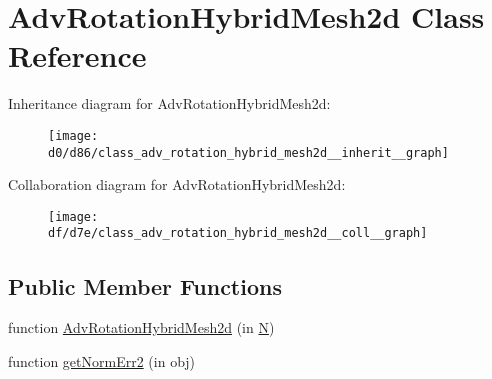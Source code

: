 \hypertarget{class_adv_rotation_hybrid_mesh2d}{}\section{Adv\+Rotation\+Hybrid\+Mesh2d Class Reference}
\label{class_adv_rotation_hybrid_mesh2d}


Inheritance diagram for Adv\+Rotation\+Hybrid\+Mesh2d\+:
\nopagebreak
\begin{figure}[H]
\begin{center}
\leavevmode
\texttt{[image: d0/d86/class\_adv\_rotation\_hybrid\_mesh2d\_\_inherit\_\_graph]}
\end{center}
\end{figure}


Collaboration diagram for Adv\+Rotation\+Hybrid\+Mesh2d\+:
\nopagebreak
\begin{figure}[H]
\begin{center}
\leavevmode
\texttt{[image: df/d7e/class\_adv\_rotation\_hybrid\_mesh2d\_\_coll\_\_graph]}
\end{center}
\end{figure}
\subsection*{Public Member Functions}
\begin{DoxyCompactItemize}
\item 
function \hyperlink{class_adv_rotation_hybrid_mesh2d_af996fb14cedc7119bf6ca6ba30b37335}{Adv\+Rotation\+Hybrid\+Mesh2d} (in \hyperlink{class_adv_rotation_hybrid_mesh2d_ad3fd21bb05479b410845dd66ba0acee1}{N})
\item 
function \hyperlink{class_adv_rotation_hybrid_mesh2d_ab215e4213627a10d02afc532d20eeff2}{get\+Norm\+Err2} (in obj)
\end{DoxyCompactItemize}
